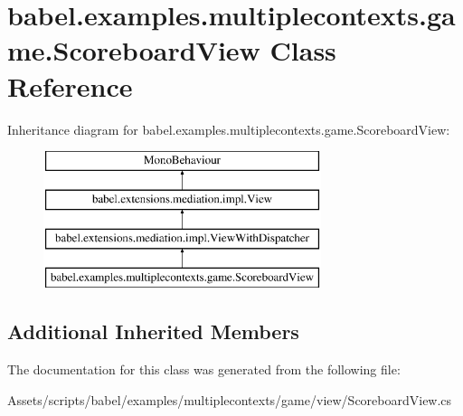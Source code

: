 \hypertarget{classbabel_1_1examples_1_1multiplecontexts_1_1game_1_1_scoreboard_view}{\section{babel.\-examples.\-multiplecontexts.\-game.\-Scoreboard\-View Class Reference}
\label{classbabel_1_1examples_1_1multiplecontexts_1_1game_1_1_scoreboard_view}
}
Inheritance diagram for babel.\-examples.\-multiplecontexts.\-game.\-Scoreboard\-View\-:\begin{figure}[H]
\begin{center}
\leavevmode
\includegraphics[height=4.000000cm]{classbabel_1_1examples_1_1multiplecontexts_1_1game_1_1_scoreboard_view}
\end{center}
\end{figure}
\subsection*{Additional Inherited Members}


The documentation for this class was generated from the following file\-:\begin{DoxyCompactItemize}
\item 
Assets/scripts/babel/examples/multiplecontexts/game/view/Scoreboard\-View.\-cs\end{DoxyCompactItemize}

